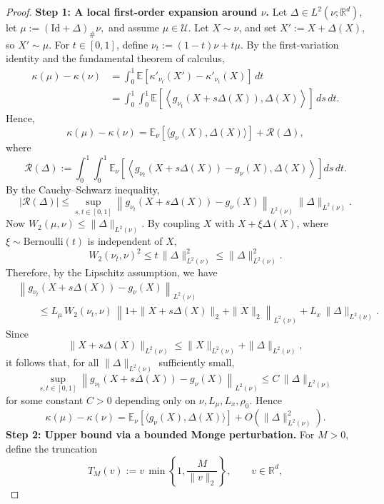 \documentclass[11pt]{article}
\theoremstyle{definition}
\newcommand{\E}{\mathbb{E}}
\begin{document}
\begin{proof}
\medskip
\noindent
{\textbf{Step 1: A local first-order expansion around \(\nu\).}
Let \(\Delta\in L^2(\nu;\mathbb R^d)\), let $\mu:=(\text{Id}+\Delta)_\#\nu,$
and assume \(\mu\in \mathcal U\). Let \(X\sim \nu\), and set \(X':=X+\Delta(X)\), so
\(X'\sim \mu\). For \(t\in[0,1]\), define \(\nu_t:=(1-t)\nu+t\mu\). By the first-variation
identity and the fundamental theorem of calculus,
\begin{align*}
\kappa(\mu)-\kappa(\nu)
&=
\int_0^1 \E\!\left[\kappa'_{\nu_t}(X')-\kappa'_{\nu_t}(X)\right]\,dt \\
&=
\int_0^1\int_0^1
\E\!\left[\left\langle g_{\nu_t}(X+s\Delta(X)),\Delta(X)\right\rangle\right]\,ds\,dt.
\end{align*}
Hence,
\[
\kappa(\mu)-\kappa(\nu)
=
\E_\nu\!\left[\langle g_\nu(X),\Delta(X)\rangle\right] + \mathcal R(\Delta),
\]
where
\[
\mathcal R(\Delta)
:=
\int_0^1\int_0^1
\E_\nu\!\left[
\left\langle g_{\nu_t}(X+s\Delta(X))-g_\nu(X),\Delta(X)\right\rangle
\right]ds\,dt.
\]
By the Cauchy--Schwarz inequality,
\[
|\mathcal R(\Delta)|
\le
\sup_{s,t\in[0,1]}
\left\|g_{\nu_t}(X+s\Delta(X))-g_\nu(X)\right\|_{L^2(\nu)}
\,
\|\Delta\|_{L^2(\nu)}.
\]
Now $W_2(\mu,\nu)\le \|\Delta\|_{L^2(\nu)}$. 
By coupling \(X\) with \(X+\xi \Delta(X)\), where \(\xi\sim \mathrm{Bernoulli}(t)\)
is independent of \(X\),
\[
W_2(\nu_t,\nu)^2\le t\,\|\Delta\|_{L^2(\nu)}^2
\le \|\Delta\|_{L^2(\nu)}^2.
\]
Therefore, by the Lipschitz assumption, we have 
\begin{align*}
&\left\|g_{\nu_t}(X+s\Delta(X))-g_\nu(X)\right\|_{L^2(\nu)} \\
&\qquad\le
L_\mu\,W_2(\nu_t,\nu)\,
\left\|1+\|X+s\Delta(X)\|_2+\|X\|_2\right\|_{L^2(\nu)}
+
L_x\,\|\Delta\|_{L^2(\nu)}.
\end{align*}
Since
\[
\|X+s\Delta(X)\|_{L^2(\nu)}
\le
\|X\|_{L^2(\nu)}+\|\Delta\|_{L^2(\nu)},
\]
it follows that, for all \(\|\Delta\|_{L^2(\nu)}\) sufficiently small,
\[
\sup_{s,t\in[0,1]}
\left\|g_{\nu_t}(X+s\Delta(X))-g_\nu(X)\right\|_{L^2(\nu)}
\le C\,\|\Delta\|_{L^2(\nu)}
\]
for some constant \(C>0\) depending only on \(\nu,L_\mu,L_x,\rho_0\). Hence
\begin{equation}
\label{eq:local_linearization_kappa}
\kappa(\mu)-\kappa(\nu)
=
\E_\nu\!\left[\langle g_\nu(X),\Delta(X)\rangle\right]
+
O\!\left(\|\Delta\|_{L^2(\nu)}^2\right).
\end{equation}
\medskip
\noindent
\textbf{Step 2: Upper bound via a bounded Monge perturbation.}
For \(M>0\), define the truncation
\[
T_M(v):=
v\,\min\!\left\{1,\frac{M}{\|v\|_2}\right\},
\qquad v\in \mathbb R^d,
\]}
\end{proof}
\end{document}
